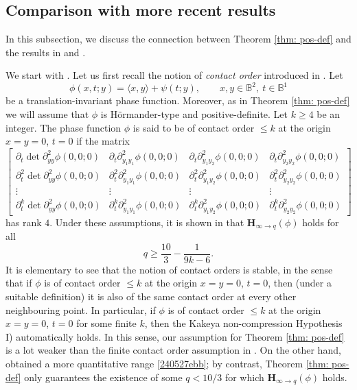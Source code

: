 \documentclass[reqno]{amsart}
\numberwithin{equation}{section}
\newcommand{\B}{\mathbb{B}}
\newcommand{\bH}{\mathbf{H}}
\def\inn#1#2{\langle#1,#2\rangle}
\theoremstyle{plain}
\theoremstyle{definition}
\begin{document}

\subsection{Comparison with more recent results}


In this subsection, we discuss the connection between Theorem \ref{thm: pos-def} and the results in \cite{dai2023oscillatory} and \cite{guo2022dichotomy}. \medskip


We start with \cite{dai2023oscillatory}. Let us first recall the notion of \textit{contact order} introduced in \cite{dai2023oscillatory}. Let 
\begin{equation*}
    \phi(x, t; y)=\inn{x}{y}+ \psi(t; y),  \qquad x, y\in \B^2, \ t\in \B^1
\end{equation*}
be a translation-invariant phase function. Moreover, as in Theorem \ref{thm: pos-def} we will assume that $\phi$ is H\"ormander-type and positive-definite. Let $k\ge 4$ be an integer. The phase function $\phi$ is said to be of contact order $\le k$ at the origin $x=y=0$, $t=0$ if the matrix 
\begin{equation*}
    \begin{bmatrix}
        \partial_t \det \partial^2_{yy} \phi(0, 0; 0) & \partial_t  \partial^2_{y_1y_1} \phi(0, 0; 0) & \partial_t  \partial^2_{y_1 y_2} \phi(0, 0; 0) & \partial_t  \partial^2_{y_2 y_2} \phi(0, 0; 0)\\
        \partial^2_t \det \partial^2_{yy} \phi(0, 0; 0) & \partial^2_t  \partial^2_{y_1y_1} \phi(0, 0; 0) & \partial^2_t  \partial^2_{y_1 y_2} \phi(0, 0; 0) & \partial^2_t  \partial^2_{y_2 y_2} \phi(0, 0; 0)\\
        \vdots & \vdots & \vdots & \vdots\\
        \partial^k_t \det \partial^2_{yy} \phi(0, 0; 0) & \partial^k_t  \partial^2_{y_1y_1} \phi(0, 0; 0) & \partial^k_t  \partial^2_{y_1 y_2} \phi(0, 0; 0) & \partial^k_t  \partial^2_{y_2 y_2} \phi(0, 0; 0)
    \end{bmatrix}
\end{equation*}
has rank $4$. Under these assumptions, it is shown in \cite{dai2023oscillatory} that $\bH_{\infty \to q}(\phi)$ holds for all 
\begin{equation}\label{240527ebb}
    q\ge \frac{10}{3}- \frac{1}{9k-6}.
\end{equation}
It is elementary to see that the notion of contact orders is stable, in the sense that if $\phi$ is of contact order $\le k$ at the origin $x=y=0$, $t=0$, then (under a suitable definition) it is also of the same contact order at every other neighbouring point. In particular, if $\phi$ is of contact order $\le k$ at the origin $x=y=0$, $t=0$ for some  finite $k$, then the Kakeya non-compression Hypothesis I) automatically holds. In this sense, our assumption for Theorem  \ref{thm: pos-def} is a lot weaker than the finite contact order assumption in \cite{dai2023oscillatory}.  On the other hand, \cite{dai2023oscillatory} obtained a more quantitative range \eqref{240527ebb}; by contrast, Theorem \ref{thm: pos-def} only guarantees the existence of some $q< 10/3$ for which $\bH_{\infty \to q}(\phi)$ holds. \medskip
\end{document}
